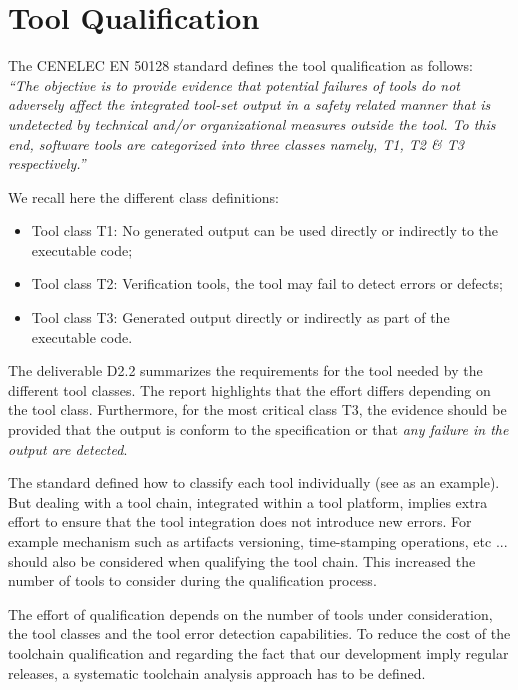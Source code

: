 \section{Tool Qualification}
\label{sec-1-1}


The CENELEC EN 50128 standard \cite{standard_railway_2011} defines the tool
qualification as follows:\\
{\it ``The objective is to provide evidence that potential
failures of tools do not adversely affect the integrated tool-set output in a
safety related manner that is undetected by technical and/or organizational
measures outside the tool. To this end, software tools are categorized into
three classes namely, T1, T2 \& T3 respectively.''}

We recall here the different class definitions:
\begin{itemize}
\item Tool class T1: No generated output can be used directly or indirectly to the
  executable code;
\item Tool class T2: Verification tools, the tool may fail to detect errors or
  defects;
\item Tool class T3: Generated output directly or indirectly  as part of the
  executable code.
\end{itemize}
The deliverable D2.2 \cite{pokam_report_2013} summarizes the requirements for the
tool needed by the different tool classes. The report highlights that the
effort differs depending on the tool class. Furthermore, for
the most critical class T3,  the evidence should be provided that the output is
conform to the specification or that \emph{any failure in the output
  are detected}. 

The standard defined how to classify each tool individually (see
\cite{nielsen_efficient_2012,huang_test_2013} as an example).  But dealing with a tool
chain, integrated within a tool platform, implies extra effort to
ensure that the tool integration does not introduce new errors. For
example mechanism such as artifacts versioning, time-stamping
operations, etc ... should also be considered when qualifying the tool
chain. This increased the number of tools to consider during the
qualification process.

The effort of qualification depends on the number of tools under
consideration, the tool classes and the tool error detection
capabilities. To reduce the cost of the toolchain qualification and
regarding the fact that our development imply regular releases, a
systematic toolchain analysis approach has to be defined.

